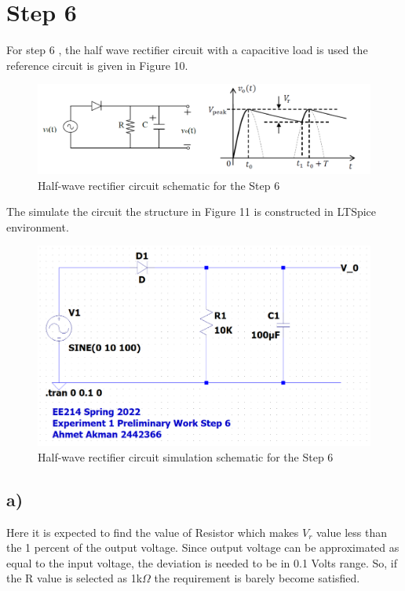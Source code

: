 \documentclass[letterpaper,12pt]{article}
\begin{document}
\section{Step 6}
For step 6 , the half wave rectifier circuit with a capacitive load is used the reference circuit is given in Figure 10. 
\begin{figure}[H]
    \centering
   \includegraphics[width=1\textwidth]{6_1.png}
   \caption{Half-wave rectifier circuit schematic for the Step 6}
\end{figure} 
The simulate the circuit the structure in Figure 11 is constructed in LTSpice environment.

\begin{figure}[H]
    \centering
   \includegraphics[width=1\textwidth]{6SCH.png}
   \caption{Half-wave rectifier circuit simulation schematic for the Step 6}
\end{figure} 



\subsection{a)}
Here it is expected to find the value of Resistor which makes \(V_r\) value less than the 1 percent of the output voltage. Since output voltage can be approximated as equal to the input voltage, the deviation is needed to be in 0.1 Volts range. So, if the R value is selected as 1k\(\Omega\)  the requirement is barely become satisfied. 
\end{document}
